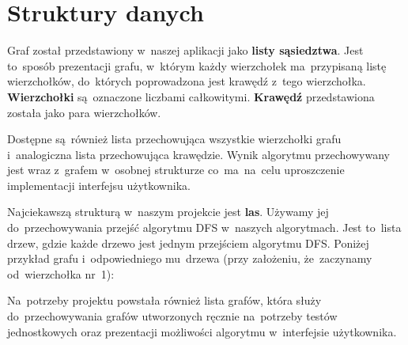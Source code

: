 \documentclass[a4paper,12pt]{mwart}
\begin{document}
\section{Struktury danych}

Graf został przedstawiony w~naszej aplikacji jako \textbf{listy sąsiedztwa}.
Jest to~sposób prezentacji grafu, w~którym każdy wierzchołek ma~przypisaną
listę wierzchołków, do~których poprowadzona jest krawędź z~tego wierzchołka.
\textbf{Wierzchołki} są~oznaczone liczbami całkowitymi. \textbf{Krawędź}
przedstawiona została jako para wierzchołków.

Dostępne są~również lista przechowująca wszystkie wierzchołki grafu
i~analogiczna lista przechowująca krawędzie. Wynik algorytmu przechowywany jest
wraz z~grafem w~osobnej strukturze co~ma~na~celu uproszczenie implementacji
interfejsu użytkownika.

Najciekawszą strukturą w~naszym projekcie jest \textbf{las}. Używamy jej
do~przechowywania przejść algorytmu DFS w~naszych algorytmach. Jest to~lista
drzew, gdzie każde drzewo jest jednym przejściem algorytmu DFS. Poniżej
przykład grafu i~odpowiedniego mu~drzewa (przy założeniu, że~zaczynamy
od~wierzchołka nr~1):

\begin{figure}[H]
  \centering
\end{figure}

Na~potrzeby projektu powstała również lista grafów, która służy
do~przechowywania grafów utworzonych ręcznie na~potrzeby testów jednostkowych
oraz prezentacji możliwości algorytmu w~interfejsie użytkownika.
\end{document}
